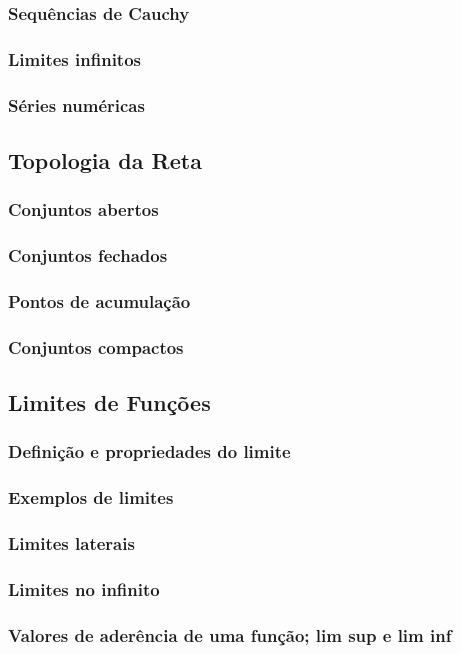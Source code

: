 \documentclass{article}
\theoremstyle{plain}
\theoremstyle{definition}
\theoremstyle{remark}
\begin{document}
   \subsubsection{ Sequências de Cauchy}
   \subsubsection{ Limites infinitos}
   \subsubsection{ Séries numéricas}
\subsection{ Topologia da Reta}
   \subsubsection{ Conjuntos abertos}
   \subsubsection{ Conjuntos fechados}
   \subsubsection{ Pontos de acumulação}
   \subsubsection{ Conjuntos compactos}
\subsection{ Limites de Funções}
   \subsubsection{ Definição e propriedades do limite}
   \subsubsection{ Exemplos de limites}
   \subsubsection{ Limites laterais}
   \subsubsection{ Limites no infinito}
   \subsubsection{ Valores de aderência de uma função; lim sup e lim inf}
\end{document}
